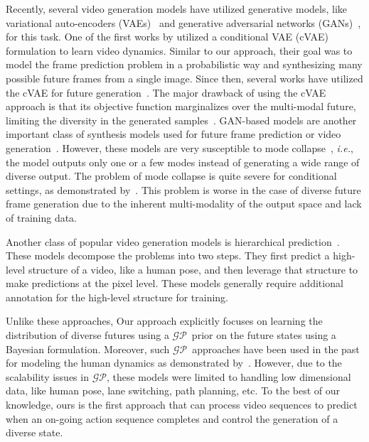 \documentclass{article} \usepackage{iclr2021_conference,times}
\newcommand{\GP}{$\mathcal{GP}$}
\def\ie{\emph{i.e.}}
\begin{document}
Recently, several video generation models have utilized generative models, like variational auto-encoders (VAEs)~\citep{Kingma2013AutoEncodingVB} and generative adversarial networks (GANs)~\citep{goodfellow2014generative}, for this task. One of the first works by \citet{visualdynamics16} utilized a conditional VAE (cVAE) formulation to learn video dynamics. Similar to our approach, their goal was to model the frame prediction problem in a probabilistic way and synthesizing many possible future frames from a single image. Since then, several works have utilized the cVAE for future generation~\citep{babaeizadeh2017stochastic,denton2018stochastic}. The major drawback of using the cVAE approach is that its objective function marginalizes over the multi-modal future, limiting the diversity in the generated samples~\citep{Bhattacharyya_2018}. GAN-based models are another important class of synthesis models used for future frame prediction or video generation~\citep{Vondrick2017GeneratingTF,Lu2017FlexibleSN,Vondrick2016GeneratingVW,Saito_2017,Tulyakov_2018,Hu_2019_ICCV}. However, these models are very susceptible to mode collapse~\citep{salimans2016improved}, \ie, the model outputs only one or a few modes instead of generating a wide range of diverse output. The problem of mode collapse is quite severe for conditional settings, as demonstrated by~\citep{Isola2016ImagetoImageTW,zhu2017multimodal,mathieu2015deep}. This problem is worse in the case of diverse future frame generation due to the inherent multi-modality of the output space and lack of training data. 

Another class of popular video generation models is hierarchical prediction~\citep{pos_iccv2017,villegas2017learning,wichers2018hierarchical,Cai_2018}. These models decompose the problems into two steps. They first predict a high-level structure of a video, like a human pose, and then leverage that structure to make predictions at the pixel level. These models generally require additional annotation for the high-level structure for training.

Unlike these approaches, Our approach explicitly focuses on learning the distribution of diverse futures using a \GP\ prior on the future states using a Bayesian formulation. Moreover, such \GP\ approaches have been used in the past for modeling the human dynamics as demonstrated by~\citep{4359316,6859020,4562106}. However, due to the scalability issues in \GP, these models were limited to handling low dimensional data, like human pose, lane switching, path planning, etc. To the best of our knowledge, ours is the first approach that can process video sequences to predict when an on-going action sequence completes and control the generation of a diverse state.
\end{document}
